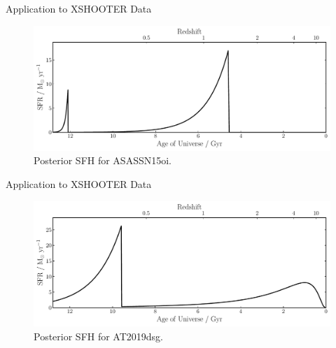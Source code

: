 \documentclass{beamer}
\begin{document}
\begin{frame}{Application to XSHOOTER Data}
  \begin{figure}
    \centering
    \includegraphics[width=\textwidth]{../pipes/plots/r4_exponential_burst/ASASSN15oi_sfh}
    \caption{Posterior SFH for ASASSN15oi.}
  \end{figure}
\end{frame}

\begin{frame}{Application to XSHOOTER Data}
  \begin{figure}
    \centering
    \includegraphics[width=\textwidth]{../pipes/plots/r4_lognormal_burst/AT2019dsg_sfh}
    \caption{Posterior SFH for AT2019dsg.}
  \end{figure}
\end{frame}
\end{document}

